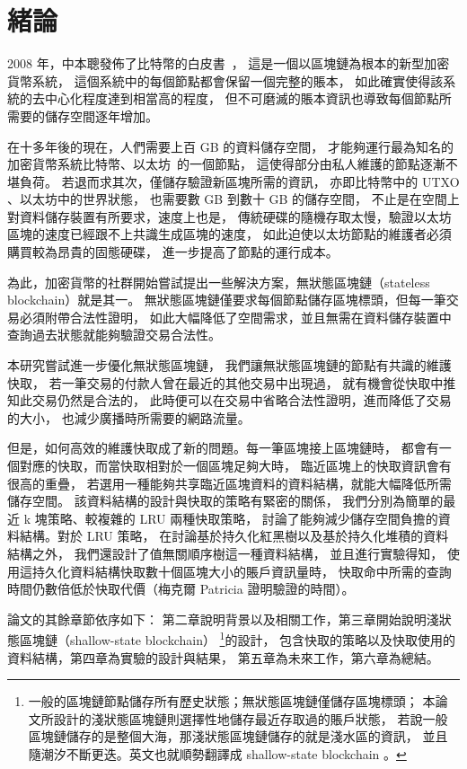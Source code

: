 \chapter{緒論}
\label{c:intro}

2008 年，中本聰發佈了比特幣的白皮書~\cite{nakamoto2019bitcoin}，
這是一個以區塊鏈為根本的新型加密貨幣系統，
這個系統中的每個節點都會保留一個完整的賬本，
如此確實使得該系統的去中心化程度達到相當高的程度，
但不可磨滅的賬本資訊也導致每個節點所需要的儲存空間逐年增加。

在十多年後的現在，人們需要上百 GB 的資料儲存空間，
才能夠運行最為知名的加密貨幣系統比特幣、以太坊~\cite{wood2014ethereum}的一個節點，
這使得部分由私人維護的節點逐漸不堪負荷。
若退而求其次，僅儲存驗證新區塊所需的資訊，
亦即比特幣中的 UTXO 、以太坊中的世界狀態，
也需要數 GB 到數十 GB 的儲存空間，
不止是在空間上對資料儲存裝置有所要求，速度上也是，
傳統硬碟的隨機存取太慢，驗證以太坊區塊的速度已經跟不上共識生成區塊的速度，
如此迫使以太坊節點的維護者必須購買較為昂貴的固態硬碟，
進一步提高了節點的運行成本。

為此，加密貨幣的社群開始嘗試提出一些解決方案，無狀態區塊鏈（stateless blockchain）就是其一。
無狀態區塊鏈僅要求每個節點儲存區塊標頭，但每一筆交易必須附帶合法性證明，
如此大幅降低了空間需求，並且無需在資料儲存裝置中查詢過去狀態就能夠驗證交易合法性。

本研究嘗試進一步優化無狀態區塊鏈，
我們讓無狀態區塊鏈的節點有共識的維護快取，
若一筆交易的付款人曾在最近的其他交易中出現過，
就有機會從快取中推知此交易仍然是合法的，
此時便可以在交易中省略合法性證明，進而降低了交易的大小，
也減少廣播時所需要的網路流量。

但是，如何高效的維護快取成了新的問題。每一筆區塊接上區塊鏈時，
都會有一個對應的快取，而當快取相對於一個區塊足夠大時，
臨近區塊上的快取資訊會有很高的重疊，
若選用一種能夠共享臨近區塊資料的資料結構，就能大幅降低所需儲存空間。
該資料結構的設計與快取的策略有緊密的關係，
我們分別為簡單的最近 k 塊策略、較複雜的 LRU 兩種快取策略，
討論了能夠減少儲存空間負擔的資料結構。對於 LRU 策略，
在討論基於持久化紅黑樹以及基於持久化堆積的資料結構之外，
我們還設計了值無關順序樹這一種資料結構，
並且進行實驗得知，
使用這持久化資料結構快取數十個區塊大小的賬戶資訊量時，
快取命中所需的查詢時間仍數倍低於快取代價（梅克爾 Patricia 證明驗證的時間）。

論文的其餘章節依序如下：
第二章說明背景以及相關工作，第三章開始說明淺狀態區塊鏈（shallow-state blockchain）
\footnote{一般的區塊鏈節點儲存所有歷史狀態；無狀態區塊鏈僅儲存區塊標頭；
本論文所設計的淺狀態區塊鏈則選擇性地儲存最近存取過的賬戶狀態，
若說一般區塊鏈儲存的是整個大海，那淺狀態區塊鏈儲存的就是淺水區的資訊，
並且隨潮汐不斷更迭。英文也就順勢翻譯成 shallow-state blockchain 。}的設計，
包含快取的策略以及快取使用的資料結構，第四章為實驗的設計與結果，
第五章為未來工作，第六章為總結。